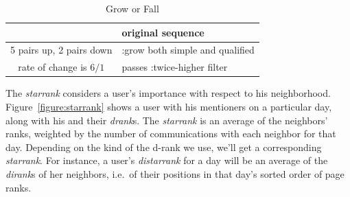 \documentclass[10pt,oneside]{memoir}
\begin{document}
\begin{table}
    \caption{Grow or Fall}
    \label{table:growfall}

    \centering

    \begin{tabular}{|c|p{2in}|}
    \hline
        [1 2 3 5 0 7 6] & original sequence\\
    \hline
         5 pairs up, 2 pairs down & :grow both simple and qualified \\
    \hline
        rate of change is $6/1$ & passes :twice-higher filter \\
    \hline
    \end{tabular}
\end{table}
The {\itshape starrank} considers a user's importance with respect to his neighborhood.  Figure~\ref{figure:starrank} shows a user with his mentioners on a particular day, along with his and their {\itshape drank}s.  The {\itshape starrank} is an average of the neighbors' ranks, weighted by the number of communications with each neighbor for that day.  Depending on the kind of the d-rank we use, we'll get a corresponding {\itshape starrank}.  For instance, a user's {\itshape distarrank} for a day will be an average of the {\itshape dirank}s of her neighbors, i.e.\ of their positions in that day's sorted order of page ranks.
\end{document}
